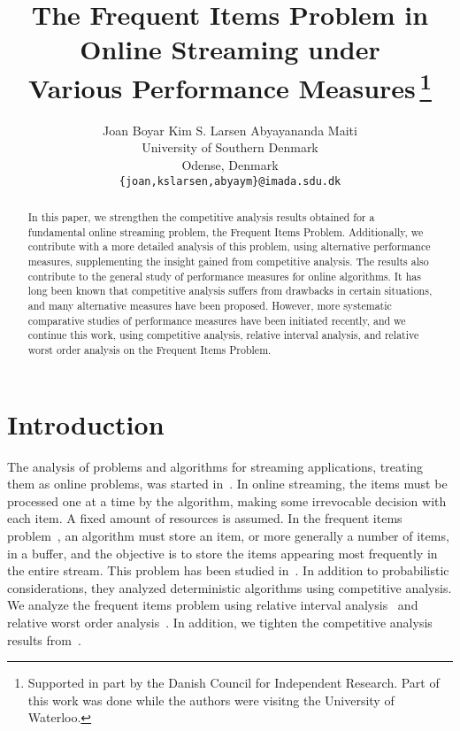 \documentclass[11pt]{article}
\begin{document}
\title{The Frequent Items Problem in \\ Online Streaming
under \\ Various Performance Measures\,\thanks{Supported
in part by the Danish Council for Independent Research.  Part 
of this work was done while the
authors were visitng the University of Waterloo.}}

\author{Joan Boyar \hspace{2em} Kim S. Larsen \hspace{2em} Abyayananda Maiti \\[1ex]
        University of Southern Denmark \\
        Odense, Denmark \\[1ex]
        {\tt \{joan,kslarsen,abyaym\}@imada.sdu.dk}}

\date{}

\maketitle

\begin{abstract}
In this paper, we strengthen the competitive analysis results obtained
for a fundamental online streaming problem, the Frequent Items Problem.
Additionally, we contribute with a more detailed analysis of this
problem, using alternative performance measures,
supplementing the insight gained from competitive analysis.
The results also contribute to the general study of
performance measures for online algorithms. It has long been known
that competitive analysis suffers from drawbacks in certain situations,
and many alternative measures have been proposed. However, more
systematic comparative studies of performance measures have
been initiated recently, and we continue this work, using competitive
analysis, relative interval analysis, and relative worst order
analysis on the Frequent Items Problem.
\end{abstract}

\section{Introduction}
The analysis of problems and algorithms for streaming applications, treating
them as online problems, was started in~\cite{Becchetti09}. 
In online streaming, the
items must be processed one at a time by the algorithm, making some irrevocable
decision with each item. A fixed amount of resources is assumed.
In the frequent items problem~\cite{CH08},
an algorithm must store an item,
or more generally a number of items, in a buffer,
and the objective is to store the items appearing most frequently in
the entire stream.
This problem has been studied in~\cite{Giannakopoulos12}.
In addition to probabilistic considerations,
they analyzed deterministic algorithms using competitive analysis.
We analyze the frequent items problem using relative interval
analysis~\cite{Dorrigiv09} and relative worst order analysis~\cite{Boyar07}.
In addition, we tighten the competitive analysis~\cite{ST85,KMRS88}
results from~\cite{Giannakopoulos12}.
\end{document}
